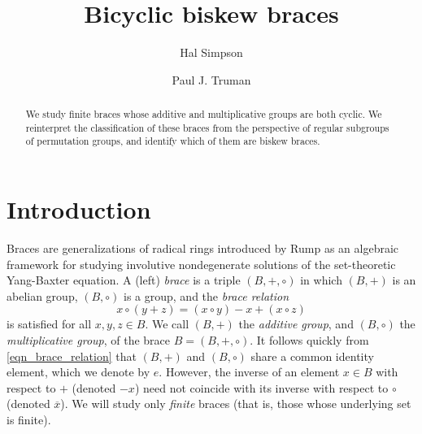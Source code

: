 \documentclass[reqno]{amsart}
\theoremstyle{definition}
\renewcommand{\bar}{\overline}
\begin{document}
\title[Bicyclic biskew braces]{Bicyclic biskew braces}

\author{Hal Simpson}
\address{School of Computer Science and Mathematics \\ Keele University \\ Staffordshire \\ ST5 5BG \\ UK}

\author{Paul J. Truman}
\address{School of Computer Science and Mathematics \\ Keele University \\ Staffordshire \\ ST5 5BG \\ UK}



\begin{abstract}
We study finite braces whose additive and multiplicative groups are both cyclic. We reinterpret the classification of these braces from the perspective of regular subgroups of permutation groups, and identify which of them are biskew braces.
\end{abstract}

\maketitle

\section{Introduction} \label{sec_introduction}

Braces are generalizations of radical rings introduced by Rump \cite{Ru07a} as an algebraic framework for studying involutive nondegenerate solutions of the set-theoretic Yang-Baxter equation. A (left) \textit{brace} is a triple $ (B,+,\circ) $ in which $ (B,+) $ is an abelian group, $ (B,\circ) $ is a group, and the \textit{brace relation} 
\begin{equation} \label{eqn_brace_relation}
x \circ (y + z) = (x \circ y) - x + (x \circ z) 
\end{equation}
is satisfied for all $ x,y,z \in B $. We call $ (B,+) $ the \textit{additive group}, and $ (B,\circ) $ the \textit{multiplicative group}, of the brace $ B = (B,+,\circ) $. It follows quickly from \eqref{eqn_brace_relation} that $ (B,+) $ and $ (B,\circ) $ share a common identity element, which we denote by $ e $. However, the inverse of an element $ x \in B $ with respect to $ + $ (denoted $ -x $) need not coincide with its inverse with respect to $ \circ $ (denoted $ \bar{x} $). We will study only \textit{finite} braces (that is, those whose underlying set is finite). 
\end{document}
